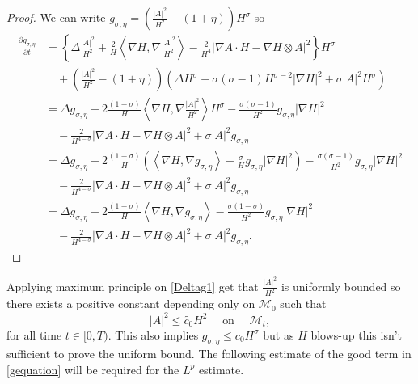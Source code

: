 \begin{proof}
    We can write $ g_{\sigma, \eta } = \left( \frac{|A|^{2}}{H^{2}}- (1+ \eta) \right)H^{\sigma}  $ so \begin{align*}
        \frac{ \partial g_{\sigma, \eta}}{ \partial t} & = \left\{\Delta \frac{|A|^{2}}{H^{2}}+ \frac{2}{H} \left< \nabla H , \nabla \frac{ |A|^{2}}{H^{2}}\right>  - \frac{2}{H^{4}}|\nabla A \cdot H - \nabla H \otimes A|^{2} \right\}H^{\sigma} \\
        & \quad + \left( \frac{|A|^{2}}{H^{2}}- (1+ \eta) \right) \left( \Delta H^{\sigma} - \sigma(\sigma -1)H^{\sigma -2}|\nabla H|^{2} + \sigma |A|^{2}H^{\sigma } \right) \\
        & = \Delta g_{\sigma, \eta} +2\frac{(1-\sigma)}{H}\left< \nabla H, \nabla \frac{|A|^{2}}{H^{2}} \right>H^{\sigma}-\frac{\sigma(\sigma-1)}{H^{2}}g_{\sigma,\eta}|\nabla H|^{2} \\
        & \quad - \frac{2}{H^{4-\sigma}}|\nabla A \cdot H - \nabla H \otimes A|^{2} + \sigma|A|^{2}g_{\sigma,\eta} \\
        & = \Delta g_{\sigma,\eta} + 2\frac{(1-\sigma)}{H}\left(\left< \nabla H, \nabla g_{\sigma,\eta} \right> - \frac{\sigma}{H} g_{\sigma,\eta}| \nabla H|^{2}\right) - \frac{\sigma(\sigma-1)}{H^{2}}g_{\sigma,\eta}|\nabla H|^{2} \\
        & \quad - \frac{2}{H^{4-\sigma}}|\nabla A \cdot H - \nabla H \otimes A|^{2} + \sigma|A|^{2}g_{\sigma,\eta} \\
        & = \Delta g_{\sigma, \eta} + 2\frac{(1-\sigma)}{H}\left< \nabla H, \nabla g_{\sigma, \eta} \right> - \frac{\sigma (1-\sigma)}{H^{2}}g_{\sigma, \eta} | \nabla H|^{2} \\
        &  \quad - \frac{2}{H^{4-\sigma}}|\nabla A \cdot H - \nabla H \otimes A|^{2} + \sigma |A|^{2} g_{\sigma, \eta}.
    \end{align*}
\end{proof}

Applying maximum principle on \cref{Deltag1} get that $ \frac{|A|^{2}}{H^{2}} $ is uniformly bounded so there exists a positive constant depending only on $ \mathcal{M}_{0} $ such that 
\[ |A|^{2} \le \tilde{c_{0}}H^{2} \quad \text{ on } \quad \mathcal{M}_{t}, \]
for all time $ t \in [0,T) $. This also implies $ g_{\sigma, \eta} \le c_{0}H^{\sigma} $ but as $ H $ blows-up this isn't sufficient to prove the uniform bound.
The following estimate of the good term in \cref{gequation} will be required for the $ L^{p} $ estimate. 


